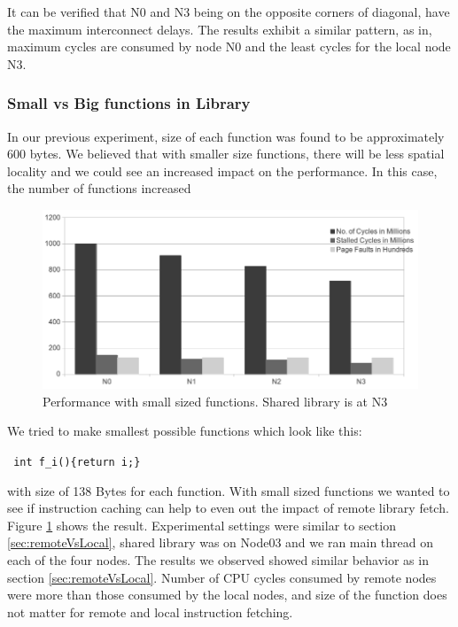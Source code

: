 It can be verified that N0 and N3 being on the opposite corners of diagonal, have the maximum interconnect delays.
The results exhibit a similar pattern, as in, maximum cycles are consumed by node N0 and the least cycles for the local node N3.

\subsubsection{Small vs Big functions in Library}

In our previous experiment, size of each function was found to be approximately 600 bytes. We believed that with smaller size
functions, there will be less spatial locality and we could see an increased impact on the performance. In this case, the number
of functions increased
\begin{figure}
    \centering
    \includegraphics[scale=0.38]{smallFunc.png}
    \caption{Performance with small sized functions. Shared library is at N3 }
    \label{fig:smallFunc}
\end{figure}

We tried to make smallest possible functions which look like this:

\texttt{ int f_i()\{return i;\} }

with size of 138 Bytes for each function.
With small sized functions we wanted to see if instruction caching can help to even out the impact of remote library fetch.
Figure \ref{fig:smallFunc} shows the result.
Experimental settings were similar to section \ref{sec:remoteVsLocal}, shared library was on Node03 and we ran main thread on each of the four nodes.
The results we observed showed similar behavior as in section \ref{sec:remoteVsLocal}.
Number of CPU cycles consumed by remote nodes were more than those consumed by the local nodes, and size of the function does not matter for remote and local instruction fetching.



